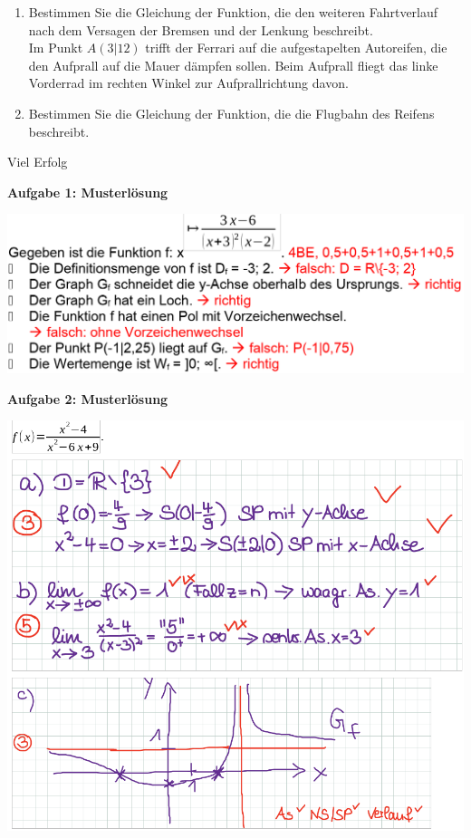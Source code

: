 \documentclass[a4paper,12pt]{article}
\newcommand{\Aufgabe}[1]{
  {
  \vspace*{0.5cm}
  \textsf{\textbf{Aufgabe #1}}
  \vspace*{0.2cm}
  
  }
}
\begin{document}
\begin{enumerate}[label={\alph*)}]
  \item Bestimmen Sie die Gleichung der Funktion, die den weiteren Fahrtverlauf nach dem Versagen der Bremsen und der Lenkung beschreibt.\\
    Im Punkt $A(3|12)$ trifft der Ferrari auf die aufgestapelten Autoreifen, die den Aufprall auf die Mauer dämpfen sollen. Beim Aufprall fliegt das linke Vorderrad im rechten Winkel zur Aufprallrichtung davon.
  \item Bestimmen Sie die Gleichung der Funktion, die die Flugbahn des Reifens beschreibt.
\end{enumerate}



\vspace{3cm}


\centerline{Viel Erfolg}







\newpage
\Aufgabe{1: Musterlösung}
\includegraphics[width=\linewidth]{Q11_1KlausurJanuar2022_ml1.png}

\Aufgabe{2: Musterlösung}
\includegraphics[width=\linewidth]{Q11_1KlausurJanuar2022_ml2.png}
\end{document}

